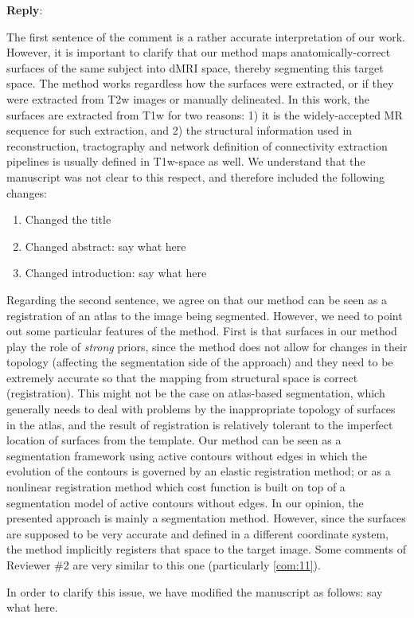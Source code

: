 \documentclass[9pt]{memoir}
\newcommand{\reply}{\par\fontshape{n}\selectfont \noindent \textbf{Reply}:\ }
\begin{document}
\reply{
The first sentence of the comment is a rather accurate interpretation of our work.
However, it is important to clarify that our method maps anatomically-correct surfaces of the same subject into dMRI space,
  thereby segmenting this target space.
The method works regardless how the surfaces were extracted, or if they were extracted from T2w images or manually delineated.
In this work, the surfaces are extracted from T1w for two reasons: 1) it is the widely-accepted MR sequence for such extraction,
  and 2) the structural information used in reconstruction, tractography and network definition of connectivity extraction pipelines
  is usually defined in T1w-space as well.
We understand that the manuscript was not clear to this respect, and therefore included the following changes:
\begin{enumerate}
\item Changed the title
\item Changed abstract: {\color{red} say what here}
\item Changed introduction: {\color{red} say what here}
\end{enumerate}

Regarding the second sentence, we agree on that our method can be seen as a registration of an atlas to the
  image being segmented.
However, we need to point out some particular features of the method.
First is that surfaces in our method play the role of \emph{strong} priors, since the method does not allow
  for changes in their topology (affecting the segmentation side of the approach) and they need to be
  extremely accurate so that the mapping from structural space is correct (registration).
This might not be the case on atlas-based segmentation, which generally needs to deal with problems by the
  inappropriate topology of surfaces in the atlas, and the result of registration is relatively tolerant
  to the imperfect location of surfaces from the template.
Our method can be seen as a segmentation framework using active contours without edges in which the evolution
  of the contours is governed by an elastic registration method;
or as a nonlinear registration method which cost function is built on top of a segmentation model of active contours
  without edges.
In our opinion, the presented approach is mainly a segmentation method.
However, since the surfaces are supposed to be very accurate and defined in a different coordinate system,
  the method implicitly registers that space to the target image.
Some comments of Reviewer \#2 are very similar to this one (particularly \autoref{com:11}).

In order to clarify this issue, we have modified the manuscript as follows: {\color{red} say what here}.
}
\end{document}
